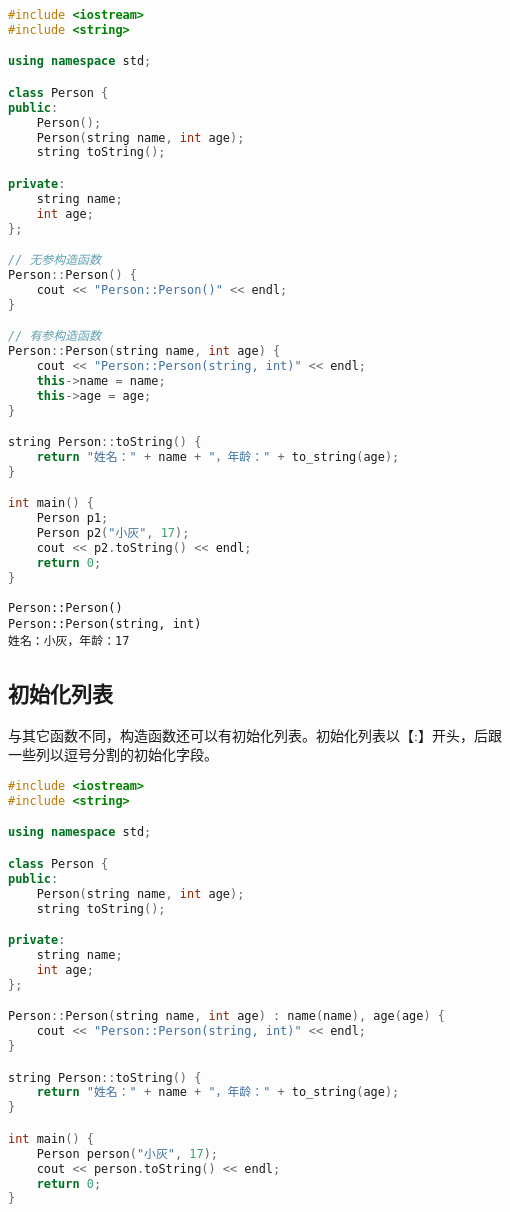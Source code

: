 
\begin{lstlisting}[language=C++]
#include <iostream>
#include <string>

using namespace std;

class Person {
public:
    Person();
    Person(string name, int age);
    string toString();

private:
    string name;
    int age;
};

// 无参构造函数
Person::Person() {
    cout << "Person::Person()" << endl;
}

// 有参构造函数
Person::Person(string name, int age) {
    cout << "Person::Person(string, int)" << endl;
    this->name = name;
    this->age = age;
}

string Person::toString() {
    return "姓名：" + name + "，年龄：" + to_string(age);
}

int main() {
    Person p1;
    Person p2("小灰", 17);
    cout << p2.toString() << endl;
    return 0;
}
\end{lstlisting}

\begin{tcolorbox}
	\begin{verbatim}
Person::Person()
Person::Person(string, int)
姓名：小灰，年龄：17
	\end{verbatim}
\end{tcolorbox}

\vspace{0.5cm}

\subsection{初始化列表}

与其它函数不同，构造函数还可以有初始化列表。初始化列表以【:】开头，后跟一些列以逗号分割的初始化字段。\\


\begin{lstlisting}[language=C++]
#include <iostream>
#include <string>

using namespace std;

class Person {
public:
    Person(string name, int age);
    string toString();

private:
    string name;
    int age;
};

Person::Person(string name, int age) : name(name), age(age) {
    cout << "Person::Person(string, int)" << endl;
}

string Person::toString() {
    return "姓名：" + name + "，年龄：" + to_string(age);
}

int main() {
    Person person("小灰", 17);
    cout << person.toString() << endl;    
    return 0;
}
\end{lstlisting}

